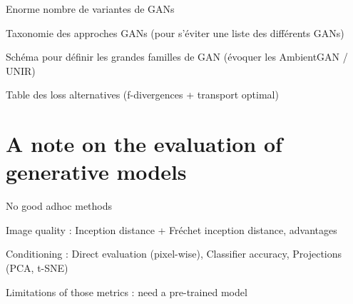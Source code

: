 Enorme nombre de variantes de GANs

Taxonomie des approches GANs (pour s'éviter une liste des différents GANs)

Schéma pour définir les grandes familles de GAN (évoquer les AmbientGAN / UNIR)

Table des loss alternatives (f-divergences + transport optimal)


\section{A note on the  evaluation of generative models}

No good adhoc methods

Image quality : Inception distance + Fréchet inception distance, advantages

Conditioning : Direct evaluation (pixel-wise), Classifier accuracy, Projections (PCA, t-SNE)

Limitations of those metrics : need a pre-trained model


